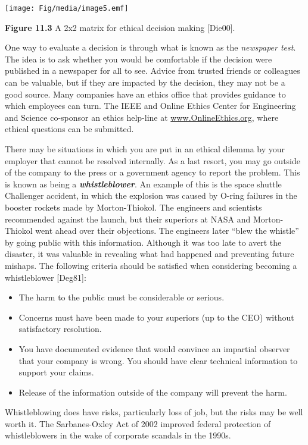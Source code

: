 \texttt{[image: Fig/media/image5.emf]}

\textbf{Figure 11.3} A 2x2 matrix for ethical decision making
{[}Die00{]}.

One way to evaluate a decision is through what is known as the
\emph{newspaper test}. The idea is to ask whether you would be
comfortable if the decision were published in a newspaper for all to
see. Advice from trusted friends or colleagues can be valuable, but if
they are impacted by the decision, they may not be a good source. Many
companies have an ethics office that provides guidance to which
employees can turn. The IEEE and Online Ethics Center for Engineering
and Science co-sponsor an ethics help-line at
\href{http://www.OnlineEthics.org}{www.OnlineEthics.org}, where ethical
questions can be submitted.

There may be situations in which you are put in an ethical dilemma by
your employer that cannot be resolved internally. As a last resort, you
may go outside of the company to the press or a government agency to
report the problem. This is known as being a
\emph{\textbf{whistleblower}}. An example of this is the space shuttle
Challenger accident, in which the explosion was caused by O-ring
failures in the booster rockets made by Morton-Thiokol. The engineers
and scientists recommended against the launch, but their superiors at
NASA and Morton-Thiokol went ahead over their objections. The engineers
later ``blew the whistle'' by going public with this information.
Although it was too late to avert the disaster, it was valuable in
revealing what had happened and preventing future mishaps. The following
criteria should be satisfied when considering becoming a whistleblower
{[}Deg81{]}:

\begin{itemize}
\item
  The harm to the public must be considerable or serious.
\item
  Concerns must have been made to your superiors (up to the CEO) without
  satisfactory resolution.
\item
  You have documented evidence that would convince an impartial observer
  that your company is wrong. You should have clear technical
  information to support your claims.
\item
  Release of the information outside of the company will prevent the
  harm.
\end{itemize}

Whistleblowing does have risks, particularly loss of job, but the risks
may be well worth it. The Sarbanes-Oxley Act of 2002 improved federal
protection of whistleblowers in the wake of corporate scandals in the
1990s.

